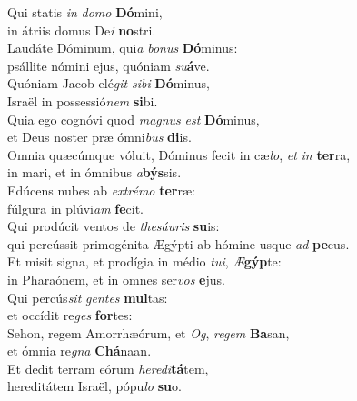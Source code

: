 \evenverse Qui statis \textit{in} \textit{do}\textit{mo} \textbf{Dó}mini,~\*\\
\evenverse in átriis domus De\textit{i} \textbf{no}stri.\\
\oddverse Laudáte Dóminum, qui\textit{a} \textit{bo}\textit{nus} \textbf{Dó}minus:~\*\\
\oddverse psállite nómini ejus, quóniam \textit{su}\textbf{á}ve.\\
\evenverse Quóniam Jacob elé\textit{git} \textit{si}\textit{bi} \textbf{Dó}minus,~\*\\
\evenverse Israël in possessió\textit{nem} \textbf{si}bi.\\
\oddverse Quia ego cognóvi quod \textit{ma}\textit{gnus} \textit{est} \textbf{Dó}minus,~\*\\
\oddverse et Deus noster præ ómni\textit{bus} \textbf{di}is.\\
\evenverse Omnia quæcúmque vóluit, Dóminus fecit in cæ\textit{lo}, \textit{et} \textit{in} \textbf{ter}ra,~\*\\
\evenverse in mari, et in ómnibus \textit{a}\textbf{býs}sis.\\
\oddverse Edúcens nubes ab \textit{ex}\textit{tré}\textit{mo} \textbf{ter}ræ:~\*\\
\oddverse fúlgura in plúvi\textit{am} \textbf{fe}cit.\\
\evenverse Qui prodúcit ventos de \textit{the}\textit{sáu}\textit{ris} \textbf{su}is:~\*\\
\evenverse qui percússit primogénita Ægýpti ab hómine usque \textit{ad} \textbf{pe}cus.\\
\oddverse Et misit signa, et prodígia in médio \textit{tu}\textit{i}, \textit{Æ}\textbf{gýp}te:~\*\\
\oddverse in Pharaónem, et in omnes ser\textit{vos} \textbf{e}jus.\\
\evenverse Qui percús\textit{sit} \textit{gen}\textit{tes} \textbf{mul}tas:~\*\\
\evenverse et occídit re\textit{ges} \textbf{for}tes:\\
\oddverse Sehon, regem Amorrhæórum, et \textit{Og}, \textit{re}\textit{gem} \textbf{Ba}san,~\*\\
\oddverse et ómnia re\textit{gna} \textbf{Chá}naan.\\
\evenverse Et dedit terram eórum \textit{he}\textit{re}\textit{di}\textbf{tá}tem,~\*\\
\evenverse hereditátem Israël, pópu\textit{lo} \textbf{su}o.\\
